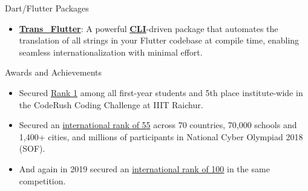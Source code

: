 \documentclass{resume}
\begin{document}
\begin{rSection}{Dart/Flutter Packages}
    \begin{itemize}
        \itemsep -3pt {}
        \item \textbf{\href{https://pub.dev/packages/trans_flutter}{Trans\_Flutter}}: A powerful \textbf{\href{https://pub.dev/packages/fluttertrans}{CLI}}-driven package that automates the translation of all strings in your Flutter codebase at compile time, enabling seamless internationalization with minimal effort.
    \end{itemize}
\end{rSection}


\begin{rSection}{Awards and Achievements}

    \begin{itemize}
        \itemsep -3pt {}
        \item Secured \href{https://drive.google.com/file/d/1BdOPAlKCXyNEZf-ujJ5Iu8lBBra77hJg/view?usp=sharing}{Rank 1} among all first-year students and 5th place institute-wide in the CodeRush Coding Challenge at IIIT Raichur.
        \item Secured an \href{https://drive.google.com/file/d/1b_JE3MbNI2eW9xpYvC1NWCfUGChuEVBy/view?usp=sharing}{international rank of 55} across 70 countries, 70,000 schools and 1,400+ cities, and millions of participants in National Cyber Olympiad 2018 (SOF).
        \item And again in 2019 secured an \href{https://drive.google.com/file/d/1bnRRCB6FZKDpJm0-Ogz15o56iG2QN_1t/view?usp=sharing}{international rank of 100} in the same competition.
    \end{itemize}

\end{rSection}

\end{document}
